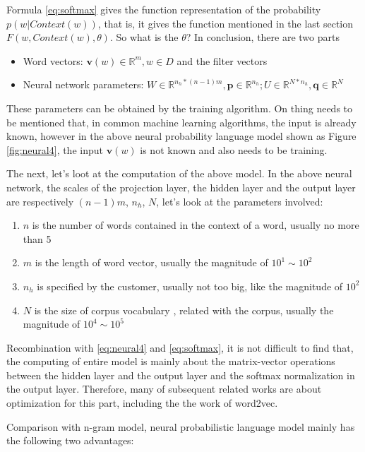 Formula \ref{eq:softmax} gives the function representation of the probability $p(w|Context(w))$, that is, it gives the function mentioned in the last section $F(w,Context(w),\theta)$. So what is the $\theta$? In conclusion, there are two parts \\
\begin{itemize}
\item Word vectors: $\mathbf{v}(w)\in \mathbb{R}^m, w\in D$ and the filter vectors
\item Neural network parameters: $W\in \mathbb{R}^{n_h*(n-1)m}, \mathbf{p}\in \mathbb{R}^{n_h}; U \in \mathbb{R}^{N*n_h}, \mathbf{q}\in \mathbb{R}^N$
\end{itemize}
These parameters can be obtained by the training algorithm. On thing needs to be mentioned that, in common machine learning algorithms, the input is already known, however in the above neural probability language model shown as Figure \ref{fig:neural4}, the input $\mathbf{v}(w)$ is not known and also needs to be training.

The next, let's loot at the computation of the above model. In the above neural network, the scales of the projection layer, the hidden layer and the output layer are respectively $(n-1)m$, $n_h$, $N$, let's look at the parameters involved:
\begin{enumerate}
\item $n$ is the number of words contained in the context of a word, usually no more than 5
\item $m$ is the length of word vector, usually the magnitude of $10^1\sim10^2$
\item $n_h$ is specified by the customer, usually not too big, like the magnitude of $10^2$
\item $N$ is the size of corpus vocabulary , related with the corpus, usually the magnitude of $10^4\sim10^5$  
\end{enumerate}
Recombination with \ref{eq:neural4} and \ref{eq:softmax}, it is not difficult to find that, the computing of entire model is mainly about the matrix-vector operations between the hidden layer and the output layer and the softmax normalization in the output layer. Therefore, many of subsequent related works are about optimization for this part, including the the work of word2vec. 

Comparison with n-gram model, neural probabilistic language model mainly has the following two advantages:

